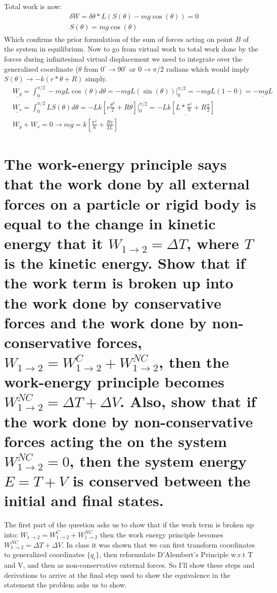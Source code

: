 \documentclass{article}
\begin{document}
Total work is now:
\begin{align*}
    & \delta W = \delta \theta * L(S(\theta) - m g \cos(\theta)) = 0 \\
    & \underline{S(\theta) = m g \cos(\theta)}
\end{align*}
Which confirms the prior formulation of the sum of forces acting on point $B$ of the system in equilibrium. Now to go from virtual work to total work done by the forces during infinitesimal virtual displacement we need to integrate over the generalized coordinate ($\theta$ from $0^{\circ} \to 90^{\circ}$ or $0 \to \pi/2$ radians which would imply $S(\theta) \to -k (r * \theta + R)$ simply.
\begin{align*}
    & \underline{W_g} = \int_{0}^{\pi/2} -m g L \cos(\theta) d\theta = -m g L (\sin(\theta))\Big|_0^{\pi/2} = -m g L (1 - 0) = \underline{-m g L} \\
    & \underline{W_s} = \int_{0}^{\pi/2} L S(\theta) d\theta = -L k [r \frac{\theta^2}{2} + R \theta]\Big|_0^{\pi/2} = \underline{-L k [L * \frac{\pi^2}{8} + R \frac{\pi}{2}]} \\
    & W_g + W_s = 0 \to \underline{m g = k [\frac{\pi^2}{8} + \frac{R \pi}{2 L}]}
\end{align*}

\section{The work-energy principle says that the work done by all external forces on a particle or rigid body is equal to the change in kinetic energy that it $W_{1 \to 2} = \Delta T$, where $T$ is the kinetic energy. Show that if the work term is broken up into the work done by conservative forces and the work done by non-conservative forces, $W_{1 \to 2} = W_{1 \to 2}^C + W_{1 \to 2}^{NC}$, then the work-energy principle becomes $W_{1 \to 2}^{NC} = \Delta T + \Delta V$. Also, show that if the work done by non-conservative forces acting the on the system $W_{1 \to 2}^{NC} = 0$, then the system energy $E = T + V$ is conserved between the initial and final states.}

The first part of the question asks us to show that if the work term is broken up into: $W_{1 \to 2} = W_{1 \to 2}^C + W_{1 \to 2}^{NC}$ then the work energy principle becomes $W_{1 \to 2}^{NC} = \Delta T + \Delta V$. In class it was shown that we can first transform coordinates to generalized coordinates $\{q_i\}$, then reformulate D'Alembert's Principle w.r.t T and V, and then as non-conservative external forces. So I'll show these steps and derivations to arrive at the final step used to show the equivalence in the statement the problem asks us to show.
\end{document}
